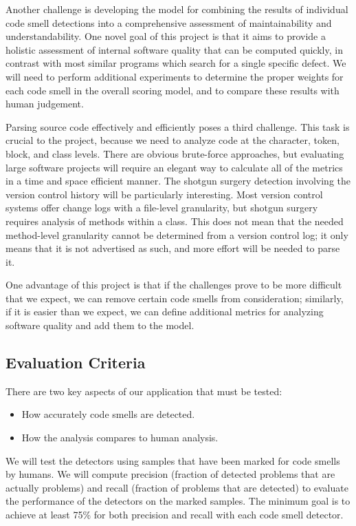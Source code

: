 \documentclass{sig-alternate}
\begin{document}
Another challenge is developing the model for combining the results of individual code smell detections into a comprehensive assessment of maintainability and understandability. One novel goal of this project is that it aims to provide a holistic assessment of internal software quality that can be computed quickly, in contrast with most similar programs which search for a single specific defect. We will need to perform additional experiments to determine the proper weights for each code smell in the overall scoring model, and to compare these results with human judgement.

Parsing source code effectively and efficiently poses a third challenge. This task is crucial to the project, because we need to analyze code at the character, token, block, and class levels. There are obvious brute-force approaches, but evaluating large software projects will require an elegant way to calculate all of the metrics in a time and space efficient manner. The shotgun surgery detection involving the version control history will be particularly interesting. Most version control systems offer change logs with a file-level granularity, but shotgun surgery requires analysis of methods within a class. This does not mean that the needed method-level granularity cannot be determined from a version control log; it only means that it is not advertised as such, and more effort will be needed to parse it. 

One advantage of this project is that if the challenges prove to be more difficult that we expect, we can remove certain code smells from consideration; similarly, if it is easier than we expect, we can define additional metrics for analyzing software quality and add them to the model.

\subsection{Evaluation Criteria}
\label{subsec:eval_criteria}

There are two key aspects of our application that must be tested:

\begin{itemize}
\item How accurately code smells are detected.
\item How the analysis compares to human analysis.
\end{itemize}

We will test the detectors using samples that have been marked for code smells by humans. We will compute precision (fraction of detected problems that are actually problems) and recall (fraction of problems that are detected) to evaluate the performance of the detectors on the marked samples. The minimum goal is to achieve at least 75\% for both precision and recall with each code smell detector.  
\end{document}
